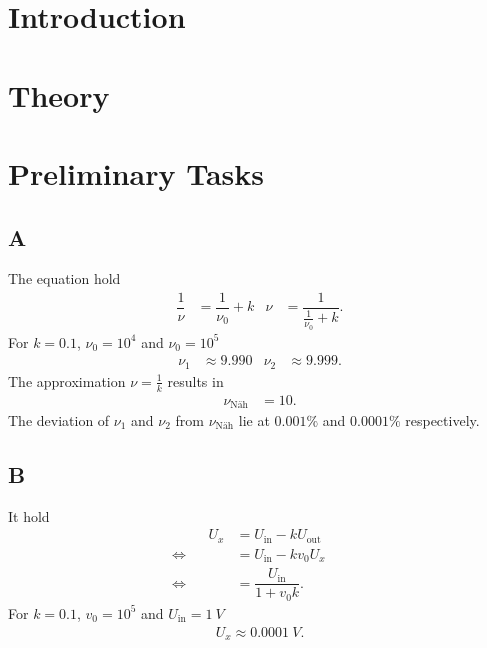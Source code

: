 \documentclass[a4paper,10pt]{article}
\numberwithin{equation}{section}
\begin{document}
\begin{multicols}{2}

        \section{Introduction}

        \section{Theory}

        \section{Preliminary Tasks}
        \subsection{A}
        The equation hold
        \begin{align} 
                \dfrac{1}{\nu }&=\dfrac{1}{\nu _0}+k&\nu &=\dfrac{1}{\tfrac{1}{\nu _0}+k}
        .\end{align} 
        For $k=0.1$, $\nu _0=10^4$ and $\nu _0=10^5$
        \begin{align} 
                \nu _1&\approx 9.990 & \nu _2&\approx 9.999
        .\end{align} 
        The approximation $\nu =\tfrac{1}{k}$ results in
        \begin{align} 
                \nu _\text{Näh}&=10
        .\end{align} 
        The deviation of $\nu _1$ and $\nu _2$ from $\nu _\text{Näh}$ lie at $0.001\%$ and $0.0001\%$ respectively.

        \subsection{B}
        It hold
        \begin{align} 
                &&&& U_x &= U_\text{in}-kU_\text{out} &&&& \\
                &&\Leftrightarrow && &= U_\text{in}-kv_0U_x &&&&\nonumber \\
                &&\Leftrightarrow && &= \dfrac{U_\text{in}}{1+v_0k}. &&&&
        \end{align} 
        For $k=0.1$, $v_0=10^5$ and $U_\text{in}=\SI{1}{V}$
        \begin{align} 
                U_x\approx \SI{0.0001}{V}
        .\end{align} 


\end{multicols}
\end{document}

